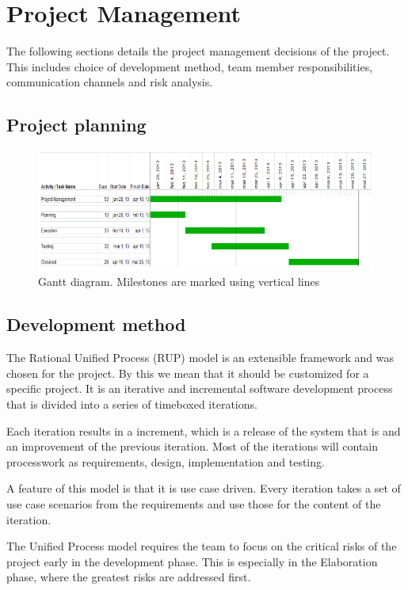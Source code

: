 \chapter{Project Management}
The following sections details the project management decisions of the project. This includes choice of development method, team member responsibilities, communication channels and risk analysis.

\section{Project planning}
\begin{figure}[H]
\includegraphics[scale=0.8]{images/gantt-diagram.png}
\caption{Gantt diagram. Milestones are marked using vertical lines}
\end{figure}

\section{Development method}
The Rational Unified Process (RUP) model is an extensible framework\cite{kruchten} and was chosen for the project. By this we mean that it should be customized for a specific project.
It is an iterative and incremental software development process that is divided into a series of timeboxed iterations.

Each iteration results in a increment, which is a release of the system that is and an improvement of the previous iteration.
Most of the iterations will contain processwork as requirements, design, implementation and testing.

A feature of this model is that it is use case driven. Every iteration takes a set of use case scenarios from the requirements and use those for the content of the iteration.

The Unified Process model requires the team to focus on the critical risks of the project early in the development phase. This is especially in the Elaboration phase, where the greatest risks are addressed first.

